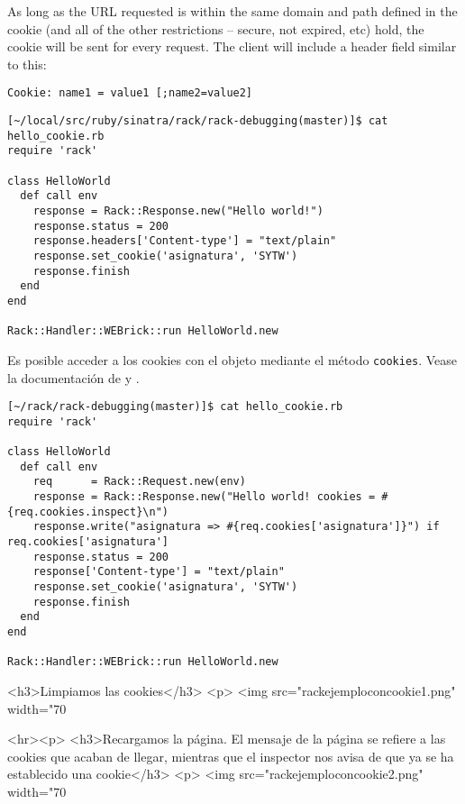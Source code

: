  As long as the URL requested is within the same domain and path
 defined in the cookie (and all of the other restrictions -- secure,
  not expired, etc) hold, the cookie will be sent for
 every request. The client will include a header field similar to this:
\begin{verbatim}
Cookie: name1 = value1 [;name2=value2]
\end{verbatim}

\begin{verbatim}
[~/local/src/ruby/sinatra/rack/rack-debugging(master)]$ cat hello_cookie.rb 
require 'rack'

class HelloWorld
  def call env
    response = Rack::Response.new("Hello world!")
    response.status = 200
    response.headers['Content-type'] = "text/plain"
    response.set_cookie('asignatura', 'SYTW')
    response.finish
  end
end

Rack::Handler::WEBrick::run HelloWorld.new
\end{verbatim}


Es posible acceder a los cookies con el objeto \rackrequest{} mediante
el método \verb|cookies|.
Vease la documentación de \rackresponse{} y \rackrequest{}.

\begin{verbatim}
[~/rack/rack-debugging(master)]$ cat hello_cookie.rb 
require 'rack'

class HelloWorld
  def call env
    req      = Rack::Request.new(env)
    response = Rack::Response.new("Hello world! cookies = #{req.cookies.inspect}\n")
    response.write("asignatura => #{req.cookies['asignatura']}") if req.cookies['asignatura']
    response.status = 200
    response['Content-type'] = "text/plain"
    response.set_cookie('asignatura', 'SYTW')
    response.finish
  end
end

Rack::Handler::WEBrick::run HelloWorld.new
\end{verbatim}


\begin{rawhtml}
<h3>Limpiamos las cookies</h3>
<p>
<img src="rackejemploconcookie1.png" width="70%
\end{rawhtml}

\begin{rawhtml}
<hr><p>
<h3>Recargamos la página. El mensaje de
la página se refiere a las cookies que acaban de llegar,
mientras que el inspector nos avisa de que ya se ha establecido
una cookie</h3>
<p>
<img src="rackejemploconcookie2.png" width="70%
\end{rawhtml}

